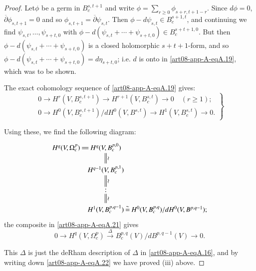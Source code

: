 \begin{proof}
Let\pageoriginale $\phi$ be a germ in $B^{s,t+1}_{c}$ and write $\phi=\sum\limits_{r\geq 0}\phi_{s+r,t+1-r}$. Since $d\phi=0$, $\overline{\partial}\phi_{s,t+1}=0$ and so $\phi_{s,t+1}=\overline{\partial}\psi_{s,t}$. Then $\phi-d\psi_{s,t}\in B^{s+1,t}_{c}$, and continuing we find $\psi_{s,t},\ldots,\psi_{s+t,0}$ with $\phi-d(\psi_{s,t}+\cdots+\psi_{s+t,0})\in B^{s+t+1,0}_{c}$. But then $\phi-d(\psi_{s,t}+\cdots+\psi_{s+t,0})$ is a closed holomorphic $s+t+1$-form, and so $\phi-d(\psi_{s,t}+\cdots+\psi_{s+t,0})=d\eta_{s+t,0}$; i.e. $d$ is onto in \eqref{art08-app-A-eqA.19}, which was to be shown.

The exact cohomology sequence of \eqref{art08-app-A-eqA.19} gives:
\begin{equation}
\left.
\begin{array}{l}
0\to H^{r}(V,B^{s,t+1}_{c})\to H^{r+1}(V,B^{s,t}_{c})\to 0\quad (r\geq 1);\\
0\to H^{0}(V,B^{s,t+1}_{c})/dH^{0}(V,B^{s,t})\to H^{1}(V,B^{s,t}_{c})\to 0.
\end{array}\right\}\label{art08-app-A-eqA.20}
\end{equation}

Using these, we find the following diagram:
\begin{equation}
\vcenter{\xymatrix@C=.17cm@R=.5cm{
H^{q}(V,\Omega^{p}_{c})\ar@{=}[r] & H^{q}(V,B^{p,0}_{c})\ar@{=}[d]^-{\rotatebox{90}{$\sim$}} & \\
 & H^{q-1}(V,B^{p,1}_{c})\ar@{=}[d]^-{\rotatebox{90}{$\sim$}} & \\
 & :\ar@{=}[d]^-{\rotatebox{90}{$\sim$}} & \\
 & H^{1}(V,B^{p,q-1}_{c})\ar@{=}[r]^-{\sim} & H^{0}(V,B^{p,q}_{c})/dH^{0}(V,B^{p,q-1}); 
}}\label{art08-app-A-eqA.21}
\end{equation}
the composite in \eqref{art08-app-A-eqA.21} gives
\begin{equation}
0\to H^{q}(V,\Omega^{p}_{c})\xrightarrow{\Delta}B^{p,q}_{c}(V)/dB^{p,q-1}(V)\to 0.\label{art08-app-A-eqA.22}
\end{equation}

This $\Delta$ is just the deRham description of $\Delta$ in \eqref{art08-app-A-eqA.16}, and by writing down \eqref{art08-app-A-eqA.22} we have proved (iii) above.
\end{proof}


